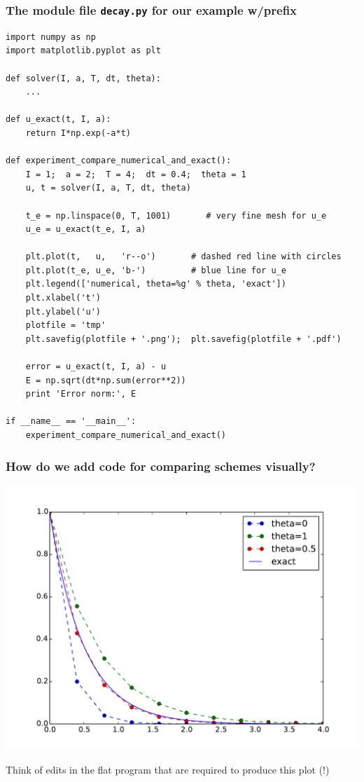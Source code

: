 \documentclass{beamer}
\begin{document}
\begin{frame}
\frametitle{The module file \texttt{decay.py} for our example w/prefix}

\begin{verbatim}
import numpy as np
import matplotlib.pyplot as plt

def solver(I, a, T, dt, theta):
    ...

def u_exact(t, I, a):
    return I*np.exp(-a*t)

def experiment_compare_numerical_and_exact():
    I = 1;  a = 2;  T = 4;  dt = 0.4;  theta = 1
    u, t = solver(I, a, T, dt, theta)

    t_e = np.linspace(0, T, 1001)       # very fine mesh for u_e
    u_e = u_exact(t_e, I, a)

    plt.plot(t,   u,   'r--o')       # dashed red line with circles
    plt.plot(t_e, u_e, 'b-')         # blue line for u_e
    plt.legend(['numerical, theta=%g' % theta, 'exact'])
    plt.xlabel('t')
    plt.ylabel('u')
    plotfile = 'tmp'
    plt.savefig(plotfile + '.png');  plt.savefig(plotfile + '.pdf')

    error = u_exact(t, I, a) - u
    E = np.sqrt(dt*np.sum(error**2))
    print 'Error norm:', E

if __name__ == '__main__':
    experiment_compare_numerical_and_exact()
\end{verbatim}
\end{frame}

\begin{frame}
\frametitle{How do we add code for comparing schemes visually?}

\centerline{\includegraphics[width=0.9\linewidth]{fig-softeng/compare.pdf}}



Think of edits in the flat program that are required to produce this plot (!)
\end{frame}
\end{document}
